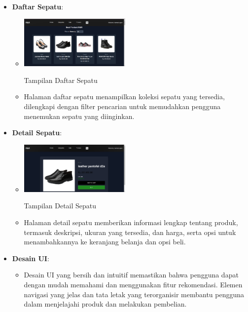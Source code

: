 \documentclass[journal,article,submit,pdftex,moreauthors]{Definitions/mdpi}
\begin{document}
\begin{enumerate}
\begin{itemize}
    \item \textbf{Daftar Sepatu}:
    \begin{itemize}
        \item \includegraphics[width=0.45\textwidth]{images/web3.png}
        \caption{Tampilan Daftar Sepatu}
        \item Halaman daftar sepatu menampilkan koleksi sepatu yang tersedia, dilengkapi dengan filter pencarian untuk memudahkan pengguna menemukan sepatu yang diinginkan.
    \end{itemize}

    \item \textbf{Detail Sepatu}:
    \begin{itemize}
        \item \includegraphics[width=0.45\textwidth]{images/web4.png}
        \caption{Tampilan Detail Sepatu}
        \item Halaman detail sepatu memberikan informasi lengkap tentang produk, termasuk deskripsi, ukuran yang tersedia, dan harga, serta opsi untuk menambahkannya ke keranjang belanja dan opsi beli.
    \end{itemize}

    \item \textbf{Desain UI}:
    \begin{itemize}
        \item Desain UI yang bersih dan intuitif memastikan bahwa pengguna dapat dengan mudah memahami dan menggunakan fitur rekomendasi. Elemen navigasi yang jelas dan tata letak yang terorganisir membantu pengguna dalam menjelajahi produk dan melakukan pembelian.
    \end{itemize}
\end{itemize}






\end{enumerate}
\end{document}
